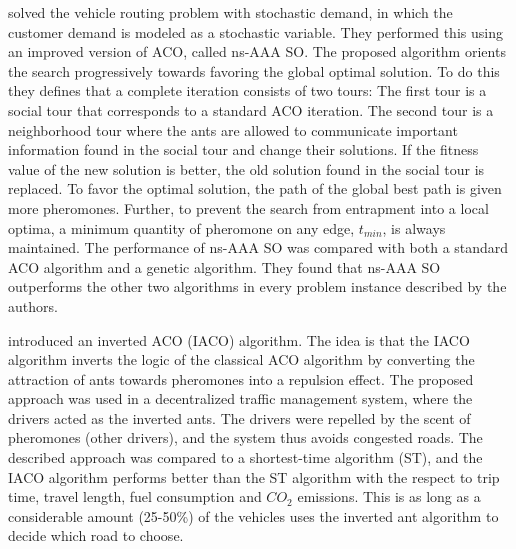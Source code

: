 \citet{tripathi09} solved the vehicle routing problem with stochastic demand, in which the customer demand is modeled as a stochastic variable. They performed this using an improved version of ACO, called ns-AAA SO. The proposed algorithm orients the search progressively towards favoring the global optimal solution. To do this they defines that a complete iteration consists of two tours: The first tour is a social tour that corresponds to a standard ACO iteration. The second tour is a neighborhood tour where the ants are allowed to communicate important information found in the social tour and change their solutions. If the fitness value of the new solution is better, the old solution found in the social tour is replaced. To favor the optimal solution, the path of the global best path is given more pheromones. Further, to prevent the search from entrapment into a local optima, a minimum quantity of pheromone on any edge, $t_{min}$, is always maintained. The performance of ns-AAA SO was compared with both a standard ACO algorithm and a genetic algorithm. They found that ns-AAA SO outperforms the other two algorithms in every problem instance described by the authors.

\citet{dias14} introduced an inverted ACO (IACO) algorithm. The idea is that the IACO algorithm inverts the logic of the classical ACO algorithm by converting the attraction of ants towards pheromones into a repulsion effect. The proposed approach was used in a decentralized traffic management system, where the drivers acted as the inverted ants. The drivers were repelled by the scent of pheromones (other drivers), and the system thus avoids congested roads. The described approach was compared to a shortest-time algorithm (ST), and the IACO algorithm performs better than the ST algorithm with the respect to trip time, travel length, fuel consumption and $CO_2$ emissions. This is as long as a considerable amount (25-50\%) of the vehicles uses the inverted ant algorithm to decide which road to choose. 


